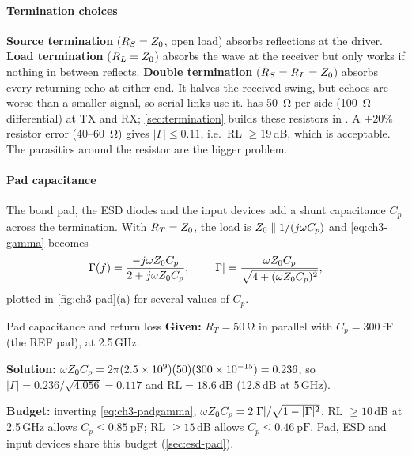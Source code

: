 \paragraph{Termination choices}
\textbf{Source termination} ($R_S = Z_0$, open load) absorbs reflections at the driver. \textbf{Load termination} ($R_L = Z_0$) absorbs the wave at the receiver but only works if nothing in between reflects. \textbf{Double termination} ($R_S = R_L = Z_0$) absorbs every returning echo at either end. It halves the received swing, but echoes are worse than a smaller signal, so serial links use it. \OS{} has \qty{50}{\ohm} per side (\qty{100}{\ohm} differential) at TX and RX; \cref{sec:termination} builds these resistors in \sgx{}. A $\pm20\%$ resistor error (40--\qty{60}{\ohm}) gives $\lvert\Gamma\rvert \le 0.11$, i.e.\ RL $\ge 19$\,dB, which is acceptable. The parasitics around the resistor are the bigger problem.

\paragraph{Pad capacitance}
The bond pad, the ESD diodes and the input devices add a shunt capacitance $C_p$ across the termination. With $R_T = Z_0$, the load is $Z_0\parallel 1/(j\omega C_p)$ and \cref{eq:ch3-gamma} becomes
\begin{equation}
  \Gamma(f) = \frac{-j\omega Z_0 C_p}{2 + j\omega Z_0 C_p}, \qquad
  \lvert\Gamma\rvert = \frac{\omega Z_0 C_p}{\sqrt{4 + (\omega Z_0 C_p)^2}} ,
  \label{eq:ch3-padgamma}
\end{equation}
plotted in \cref{fig:ch3-pad}(a) for several values of $C_p$.

\begin{example}{Pad capacitance and return loss}\label{we:ch3-pad}
\textbf{Given:} $R_T = \qty{50}{\ohm}$ in parallel with $C_p = \qty{300}{\femto\farad}$ (the REF pad), at 2.5\,GHz.

\textbf{Solution:} $\omega Z_0 C_p = 2\pi(2.5\times10^9)(50)(300\times10^{-15}) = 0.236$, so $\lvert\Gamma\rvert = 0.236/\sqrt{4.056} = 0.117$ and $\mathrm{RL} = \qty{18.6}{\deci\bel}$ (12.8\,dB at 5\,GHz).

\textbf{Budget:} inverting \cref{eq:ch3-padgamma}, $\omega Z_0 C_p = 2\lvert\Gamma\rvert/\sqrt{1-\lvert\Gamma\rvert^2}$. RL $\ge 10$\,dB at 2.5\,GHz allows $C_p \le \qty{0.85}{\pico\farad}$; RL $\ge 15$\,dB allows $C_p \le \qty{0.46}{\pico\farad}$. Pad, ESD and input devices share this budget (\cref{sec:esd-pad}).
\end{example}


